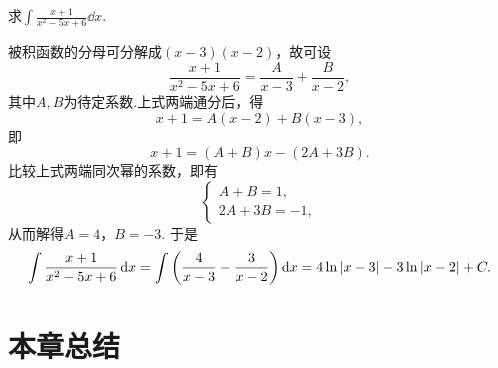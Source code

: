 \begin{example}
求\(\int \frac{x+1}{x^2-5x+6} \dd{x}\).
\begin{solution}
被积函数的分母可分解成\((x-3)(x-2)\)，故可设\[
	\frac{x+1}{x^2-5x+6}
	= \frac{A}{x-3} + \frac{B}{x-2},
\]
其中\(A,B\)为待定系数.上式两端通分后，得\[
	x+1 = A(x-2)+B(x-3),
\]
即\[
	x+1 = (A+B)x -(2A+3B).
\]
比较上式两端同次幂的系数，即有\[
	\left\{ \begin{array}{l}
		A+B = 1, \\
		2A+3B = -1,
	\end{array} \right.
\]
从而解得\(A=4\)，\(B=-3\).
于是\[
	\int \frac{x+1}{x^2-5x+6} \dd{x}
	= \int \left(\frac{4}{x-3} - \frac{3}{x-2}\right) \dd{x}
	= 4\ln\abs{x-3} - 3\ln\abs{x-2} + C.
\]
\end{solution}
\end{example}

\section{本章总结}
